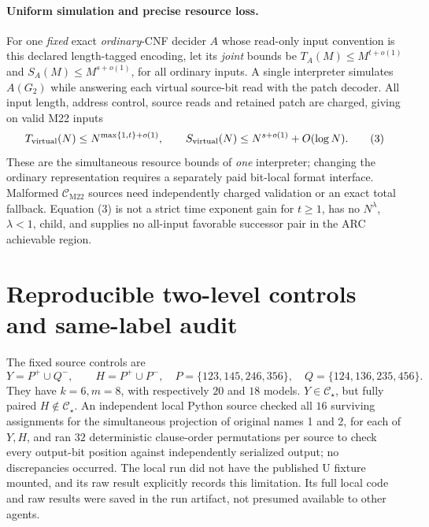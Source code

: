 \documentclass[11pt]{article}
\newcommand{\CM}{\mathcal C_{\mathrm{M22}}}
\newcommand{\CS}{\mathcal C_\star}
\begin{document}
\paragraph{Uniform simulation and precise resource loss.}
For one \emph{fixed} exact \emph{ordinary}-CNF decider $A$ whose read-only input convention is this declared length-tagged encoding, let its \emph{joint} bounds be $T_A(M)\le M^{t+o(1)}$ and $S_A(M)\le M^{s+o(1)}$, for all ordinary inputs. A single interpreter simulates $A(G_2)$ while answering each virtual source-bit read with the patch decoder. All input length, address control, source reads and retained patch are charged, giving on valid M22 inputs
\[
 T_{\rm virtual}(N)\le N^{\max\{1,t\}+o(1)},\qquad
 S_{\rm virtual}(N)\le N^{s+o(1)}+O(\log N).     \tag{3}
\]
These are the simultaneous resource bounds of \emph{one} interpreter; changing the ordinary representation requires a separately paid bit-local format interface. Malformed $\CM$ sources need independently charged validation or an exact total fallback. Equation (3) is not a strict time exponent gain for $t\ge1$, has no $N^\lambda$, $\lambda<1$, child, and supplies no all-input favorable successor pair in the ARC achievable region.

\section{Reproducible two-level controls and same-label audit}
The fixed source controls are
\[
 Y=P^+\cup Q^-,\qquad H=P^+\cup P^-,
 \quad P=\{123,145,246,356\},\quad
 Q=\{124,136,235,456\}.
\]
They have $k=6,m=8$, with respectively $20$ and $18$ models. $Y\in\CS$, but fully paired $H\notin\CS$. An independent local Python source checked all $16$ surviving assignments for the simultaneous projection of original names 1 and 2, for each of $Y,H$, and ran $32$ deterministic clause-order permutations per source to check every output-bit position against independently serialized output; no discrepancies occurred. The local run did not have the published U fixture mounted, and its raw result explicitly records this limitation. Its full local code and raw results were saved in the run artifact, not presumed available to other agents.
\end{document}
